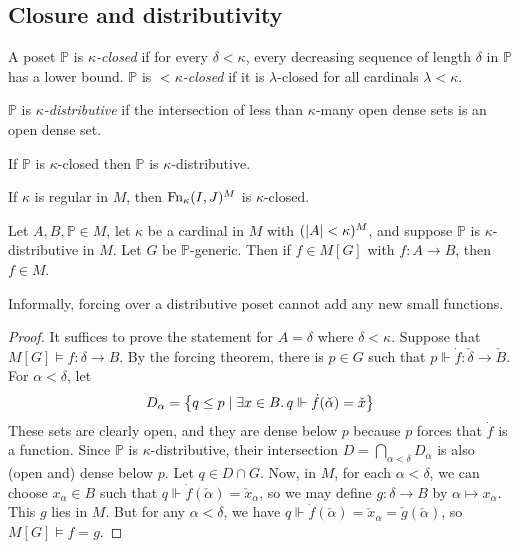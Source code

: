 \subsection{Closure and distributivity}
\begin{definition}
    A poset \( \mathbb P \) is \emph{\( \kappa \)-closed} if for every \( \delta < \kappa \), every decreasing sequence of length \( \delta \) in \( \mathbb P \) has a lower bound.
    \( \mathbb P \) is \emph{\( <\kappa \)-closed} if it is \( \lambda \)-closed for all cardinals \( \lambda < \kappa \).
\end{definition}
\begin{definition}
    \( \mathbb P \) is \emph{\( \kappa \)-distributive} if the intersection of less than \( \kappa \)-many open dense sets is an open dense set.
\end{definition}
\begin{lemma}
    If \( \mathbb P \) is \( \kappa \)-closed then \( \mathbb P \) is \( \kappa \)-distributive.
\end{lemma}
\begin{lemma}
    If \( \kappa \) is regular in \( M \), then \( \operatorname{Fn}_\kappa(I, J)^M \) is \( \kappa \)-closed.
\end{lemma}
\begin{theorem}
    Let \( A, B, \mathbb P \in M \), let \( \kappa \) be a cardinal in \( M \) with \( (\abs{A} < \kappa)^M \), and suppose \( \mathbb P \) is \( \kappa \)-distributive in \( M \).
    Let \( G \) be \( \mathbb P \)-generic.
    Then if \( f \in M[G] \) with \( f : A \to B \), then \( f \in M \).
\end{theorem}
Informally, forcing over a distributive poset cannot add any new small functions.
\begin{proof}
    It suffices to prove the statement for \( A = \delta \) where \( \delta < \kappa \).
    Suppose that \( M[G] \vDash f : \delta \to B \).
    By the forcing theorem, there is \( p \in G \) such that \( p \Vdash \dot f : \check \delta \to \check B \).
    For \( \alpha < \delta \), let
    \[ D_\alpha = \qty{q \leq p \mid \exists x \in B .\, q \Vdash \dot f(\check \alpha) = \check x} \]
    These sets are clearly open, and they are dense below \( p \) because \( p \) forces that \( \dot f \) is a function.
    Since \( \mathbb P \) is \( \kappa \)-distributive, their intersection \( D = \bigcap_{\alpha < \delta} D_\alpha \) is also (open and) dense below \( p \).
    Let \( q \in D \cap G \).
    Now, in \( M \), for each \( \alpha < \delta \), we can choose \( x_\alpha \in B \) such that \( q \Vdash \dot f(\check \alpha) = \check x_\alpha \), so we may define \( g : \delta \to B \) by \( \alpha \mapsto x_\alpha \).
    This \( g \) lies in \( M \).
    But for any \( \alpha < \delta \), we have \( q \Vdash \dot f(\check \alpha) = \check x_\alpha = \check g(\check \alpha) \), so \( M[G] \vDash f = g \).
\end{proof}
